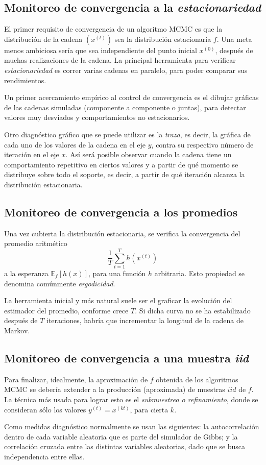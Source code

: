 \subsection{Monitoreo de convergencia a la \textit{estacionariedad}}

El primer requisito de convergencia de un algoritmo MCMC es que la distribución de la cadena $(x^{(t)})$ sea la distribución estacionaria $f$. Una meta menos ambiciosa sería que sea independiente del punto inicial $x^{(0)}$, después de muchas realizaciones de la cadena. La principal herramienta para verificar \textit{estacionariedad} es correr varias cadenas en paralelo, para poder comparar sus rendimientos. 

Un primer acercamiento empírico al control de convergencia es el dibujar gráficas de las cadenas simuladas (componente a componente o juntas), para detectar valores muy desviados y comportamientos no estacionarios. 

Otro diagnóstico gráfico que se puede utilizar es la \textit{traza}, es decir, la gr\'afica de cada uno de los valores de la cadena en el eje $y$, contra su respectivo n\'umero de iteraci\'on en el eje $x$. As\'i ser\'a posible observar cuando la cadena tiene un comportamiento repetitivo en ciertos valores y a partir de qu\'e momento se distribuye sobre todo el soporte, es decir, a partir de qu\'e iteraci\'on alcanza la distribuci\'on estacionaria. 

\subsection{Monitoreo de convergencia a los promedios}

Una vez cubierta la distribución estacionaria, se verifica la convergencia del promedio aritmético
\begin{equation*}
    \frac{1}{T}\sum_{t=1}^T h(x^{(t)})
\end{equation*}
a la esperanza $\mathbb{E}_f[h(x)]$, para una función $h$ arbitraria. Esto propiedad se denomina com\'unmente \textit{ergodicidad}.

La herramienta inicial y más natural suele ser el graficar la evolución del estimador del promedio, conforme crece $T$. Si dicha curva no se ha estabilizado después de $T$ iteraciones, habría que incrementar la longitud de la cadena de Markov.

\subsection{Monitoreo de convergencia a una muestra \textit{iid}}

Para finalizar, idealmente, la aproximación de $f$ obtenida de los algoritmos MCMC se debería extender a la producción (aproximada) de muestras $iid$ de $f$. La técnica más usada para lograr esto es el \textit{submuestreo o refinamiento}, donde se consideran s\'olo los valores $y^{(t)} = x^{(kt)}$, para cierta $k$.

Como medidas diagn\'ostico normalmente se usan las siguientes: la autocorrelaci\'on dentro de cada variable aleatoria que es parte del simulador de Gibbs; y la correlaci\'on cruzada entre las distintas variables aleatorias, dado que se busca independencia entre ellas.

\newpage